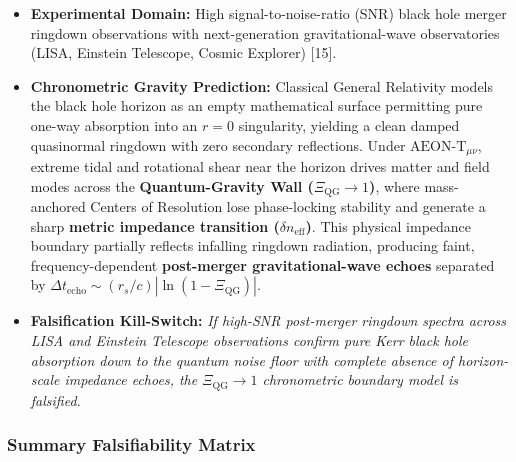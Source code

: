 \documentclass[
]{article}
\providecommand{\tightlist}{%
  \setlength{\itemsep}{0pt}\setlength{\parskip}{0pt}}
\begin{document}
\begin{itemize}
\tightlist
\item
  \textbf{Experimental Domain:} High signal-to-noise-ratio (SNR) black
  hole merger ringdown observations with next-generation
  gravitational-wave observatories (LISA, Einstein Telescope, Cosmic
  Explorer) {[}15{]}.
\item
  \textbf{Chronometric Gravity Prediction:} Classical General Relativity
  models the black hole horizon as an empty mathematical surface
  permitting pure one-way absorption into an \(r = 0\) singularity,
  yielding a clean damped quasinormal ringdown with zero secondary
  reflections. Under \(\text{AEON-T}_{\mu\nu}\), extreme tidal and
  rotational shear near the horizon drives matter and field modes across
  the \textbf{Quantum-Gravity Wall (\(\Xi_{\mathrm{QG}} \to 1\))}, where
  mass-anchored Centers of Resolution lose phase-locking stability and
  generate a sharp \textbf{metric impedance transition
  (\(\delta n_{\mathrm{eff}}\))}. This physical impedance boundary
  partially reflects infalling ringdown radiation, producing faint,
  frequency-dependent \textbf{post-merger gravitational-wave echoes}
  separated by
  \(\Delta t_{\mathrm{echo}} \sim (r_s / c) |\ln(1 - \Xi_{\mathrm{QG}})|\).
\item
  \textbf{Falsification Kill-Switch:} \emph{If high-SNR post-merger
  ringdown spectra across LISA and Einstein Telescope observations
  confirm pure Kerr black hole absorption down to the quantum noise
  floor with complete absence of horizon-scale impedance echoes, the
  \(\Xi_{\mathrm{QG}} \to 1\) chronometric boundary model is falsified.}
\end{itemize}

\subsubsection{Summary Falsifiability
Matrix}\label{summary-falsifiability-matrix}
\end{document}
